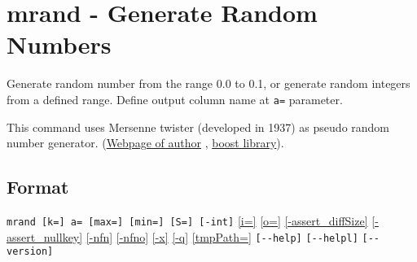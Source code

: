 
%

\section{mrand - Generate Random Numbers\label{sect:mrand}}
Generate random number from the range 0.0 to 0.1, or generate random integers from a defined range. Define output column name at \verb|a=| parameter. 

This command uses Mersenne twister (developed in 1937) as pseudo random number generator.
(\href{http://www.math.sci.hiroshima-u.ac.jp/~m-mat/MT/emt.html}{Webpage of author}
, \href{http://www.boost.org/doc/libs/1_54_0/doc/html/boost_random.html}{boost library}).



\subsection*{Format}
\verb/mrand [k=] a= [max=] [min=] [S=] [-int]/
\hyperref[sect:option_i]{[i=]}
\hyperref[sect:option_o]{[o=]}
\hyperref[sect:option_assert_diffSize]{[-assert\_diffSize]}
\hyperref[sect:option_assert_nullkey]{[-assert\_nullkey]}
\hyperref[sect:option_nfn]{[-nfn]} 
\hyperref[sect:option_nfno]{[-nfno]}  
\hyperref[sect:option_x]{[-x]}
\hyperref[sect:option_q]{[-q]}  
\hyperref[sect:option_option_tmppath]{[tmpPath=]}
\verb|[--help]|
\verb|[--helpl]|
\verb|[--version]|\\


